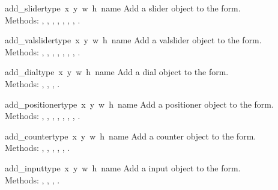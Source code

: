 \begin{flushleft}

\begin{funcdesc}{add_slider}{type\, x\, y\, w\, h\, name}
Add a slider object to the form. \\
Methods:
,
,
,
,
,
,
,
.
\end{funcdesc}

\begin{funcdesc}{add_valslider}{type\, x\, y\, w\, h\, name}
Add a valslider object to the form. \\
Methods:
,
,
,
,
,
,
,
.
\end{funcdesc}

\begin{funcdesc}{add_dial}{type\, x\, y\, w\, h\, name}
Add a dial object to the form. \\
Methods:
,
,
,
.
\end{funcdesc}

\begin{funcdesc}{add_positioner}{type\, x\, y\, w\, h\, name}
Add a positioner object to the form. \\
Methods:
,
,
,
,
,
,
,
.
\end{funcdesc}

\begin{funcdesc}{add_counter}{type\, x\, y\, w\, h\, name}
Add a counter object to the form. \\
Methods:
,
,
,
,
,
.
\end{funcdesc}


\begin{funcdesc}{add_input}{type\, x\, y\, w\, h\, name}
Add a input object to the form. \\
Methods:
,
,
,
.
\end{funcdesc}


\end{flushleft}
